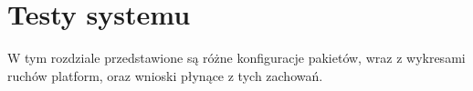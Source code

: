 \chapter{Testy systemu}
W tym rozdziale przedstawione są różne konfiguracje pakietów, wraz z wykresami ruchów platform, oraz wnioski płynące z tych zachowań.

% 
% 
% 	
% 
% 
